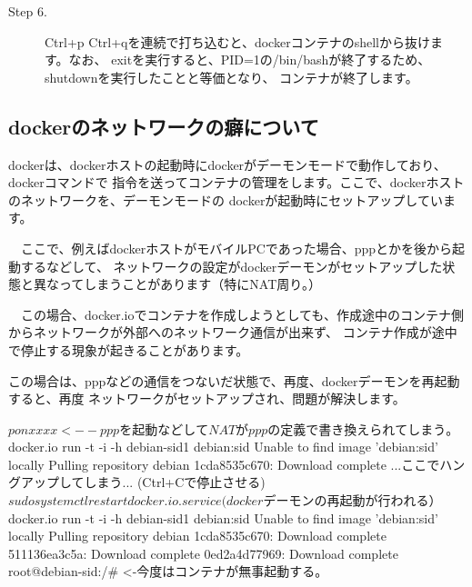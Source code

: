 \documentclass[mingoth,a4paper]{jsarticle}
\begin{document}
\begin{description}
 \item [Step 6.] Ctrl+p Ctrl+qを連続で打ち込むと、dockerコンテナのshellから抜けます。なお、
exitを実行すると、PID=1の/bin/bashが終了するため、shutdownを実行したことと等価となり、
コンテナが終了します。
 \end{description}  

\subsection{dockerのネットワークの癖について}

 dockerは、dockerホストの起動時にdockerがデーモンモードで動作しており、dockerコマンドで
指令を送ってコンテナの管理をします。ここで、dockerホストのネットワークを、デーモンモードの
dockerが起動時にセットアップしています。

　ここで、例えばdockerホストがモバイルPCであった場合、pppとかを後から起動するなどして、
ネットワークの設定がdockerデーモンがセットアップした状態と異なってしまうことがあります（特にNAT周り。）

　この場合、docker.ioでコンテナを作成しようとしても、作成途中のコンテナ側からネットワークが外部へのネットワーク通信が出来ず、
コンテナ作成が途中で停止する現象が起きることがあります。

 この場合は、pppなどの通信をつないだ状態で、再度、dockerデーモンを再起動すると、再度
ネットワークがセットアップされ、問題が解決します。

  \begin{commandline}
$ pon xxxx <-- pppを起動などしてNATがpppの定義で書き換えられてしまう。
$ docker.io run -t -i -h debian-sid1 debian:sid
Unable to find image 'debian:sid' locally
Pulling repository debian
1cda8535c670: Download complete 
...ここでハングアップしてしまう...
(Ctrl+Cで停止させる)
$ sudo systemctl restart docker.io.service 
(dockerデーモンの再起動が行われる）
$ docker.io run -t -i -h debian-sid1 debian:sid
Unable to find image 'debian:sid' locally
Pulling repository debian
1cda8535c670: Download complete 
511136ea3c5a: Download complete 
0ed2a4d77969: Download complete 
root@debian-sid:/#  <-今度はコンテナが無事起動する。
　\end{commandline}
\end{document}
